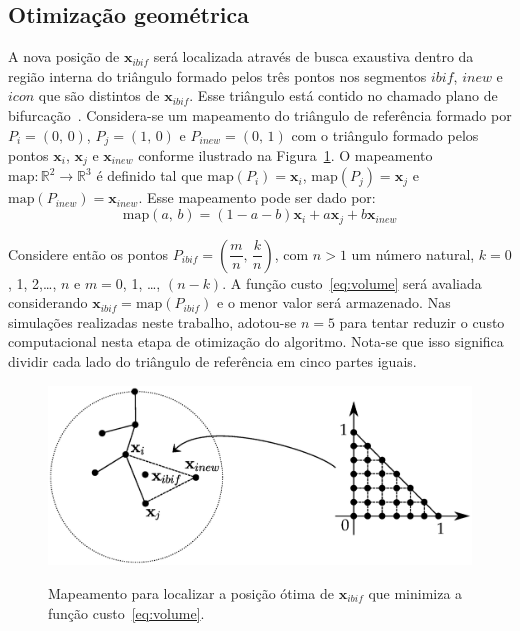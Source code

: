 \subsection{Otimização geométrica}\label{sec:otimizacao-geometrica}

A nova posição de $\mathbf{x}_{ibif}$ será localizada
através de busca exaustiva dentro da região interna do triângulo 
formado pelos três pontos nos segmentos $ibif$, $inew$ e $icon$ que são distintos de $\mathbf{x}_{ibif}$.
Esse triângulo está contido no chamado plano de bifurcação~\cite{Karch1999}. 
Considera-se um mapeamento do triângulo de referência formado por $P_{i} = (0,\,0)$, 
$P_{j} = (1,\,0)$ e $P_{inew} = (0,\,1)$ com o triângulo formado pelos pontos 
$\mathbf{x}_{i}$, $\mathbf{x}_{j}$ e $\mathbf{x}_{inew}$ conforme ilustrado na 
Figura~\ref{fig:otimizacao-ponto-bifurcacao}. O mapeamento 
$\mathrm{map}:\mathbb{R}^2\to\mathbb{R}^3$ é definido tal que $\mathrm{map}(P_i) = \mathbf{x}_{i}$, 
$\mathrm{map}(P_j) = \mathbf{x}_{j}$ e $\mathrm{map}(P_{inew}) = \mathbf{x}_{inew}$. 
Esse mapeamento pode ser dado por:
\begin{equation}
  \mathrm{map}(a,\,b) = (1 - a - b)\mathbf{x}_{i} + a\mathbf{x}_{j} + b\mathbf{x}_{inew}
  \label{eq:mapeamento-bifucacao}
\end{equation}

Considere então os pontos $P_{ibif} = \left(\dfrac{m}{n},\,\dfrac{k}{n}\right)$, com $n > 1$ um 
número natural, $k = 0$, 1, 2,\ldots, $n$ e $m = 0$, 1, \ldots, $(n-k)$. A função custo~\eqref{eq:volume} 
será avaliada considerando $\mathbf{x}_{ibif} = \mathrm{map}(P_{ibif})$ e o menor valor será 
armazenado. Nas simulações realizadas neste trabalho, adotou-se $n = 5$ para tentar reduzir o 
custo computacional nesta etapa de otimização do algoritmo. Nota-se que isso significa dividir cada 
lado do triângulo de referência em cinco partes iguais.

\begin{figure}[!htb]
  \centering
  \captiondelim{: }
  \caption{Mapeamento para localizar a posição ótima de $\mathbf{x}_{ibif}$ que minimiza a função custo~\eqref{eq:volume}.}
  \includegraphics[width=\textwidth]{figuras/modelos-computacionais-de-arvores-circulatorias/otimizacao-do-ponto-de-bifurcacao.eps}
  \label{fig:otimizacao-ponto-bifurcacao}
\end{figure}

